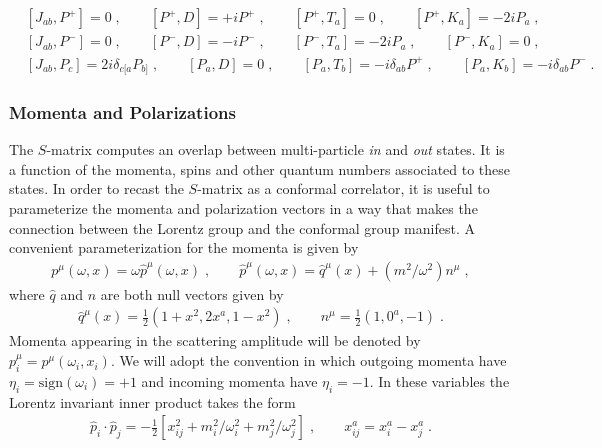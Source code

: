 \documentclass[11pt]{article}
\def\d{{\delta}}
\def\o{{\omega}}
\begin{document}
\begin{equation}
\begin{split}\label{eq:transAlgebra}
&[  J_{ab} ,  P^+ ] = 0  \;,  \qquad [ P^+ , D  ] = + i  P^+ \;, \qquad [ P^+ , T_a  ] = 0 \; , \qquad [ P^+ , K_a  ] = -2iP_a \; ,  \\
&[ J_{ab} ,  P^- ] =0  \;, \qquad [ P^- , D  ] = - i  P^- \;,  \qquad [ P^- , T_a  ] = -2iP_a \;,  \qquad [ P^- , K_a  ] = 0 \; , \\
&[ J_{ab} ,  P_c ] = 2 i \d_{c[a}  P_{b]}    \;,  \qquad [ P_a , D ] = 0 \;,  \qquad [ P_a , T_b ] = -i\delta_{ab}P^+ \; ,  \qquad [ P_a , K_b ] = -i\delta_{ab}P^- \;.  
\end{split}
\end{equation}



\subsubsection*{Momenta and Polarizations}

The $S$-matrix computes an overlap between multi-particle \emph{in} and \emph{out} states. It is a function of the momenta, spins and other quantum numbers associated to these states. In order to recast the $S$-matrix as a conformal correlator, it is useful to parameterize the momenta and polarization vectors in a way that makes the connection between the Lorentz group and the conformal group manifest. A convenient parameterization for the momenta is given by
\begin{equation}
\begin{split}\label{mompar}
p^\mu(\o,x) = \o {\hat p}^\mu ( \o , x ) \; , \qquad {\hat p}^\mu(\o,x) = {\hat q}^\mu(x) + ( m^2 / \o^2 )  n^\mu \; , 
\end{split}
\end{equation}
where ${\hat q}$ and $n$ are both null vectors given by
\begin{equation}\label{eq:nullMom}
\begin{split}
{\hat q}^\mu(x) = \frac{1}{2} ( 1 + x^2 , 2 x^a , 1 - x^2 ) \; , \qquad n^\mu = \frac{1}{2} ( 1 , 0^a , - 1 )  \; . 
\end{split}
\end{equation}
Momenta appearing in the scattering amplitude will be denoted by $p^\mu_i = p^\mu ( \o_i , x_i )$. We will adopt the convention in which outgoing momenta have $\eta_i = \text{sign}(\o_i) = +1$ and incoming momenta have $\eta_i = -1$. In these variables the Lorentz invariant inner product takes the form
\begin{equation}
\begin{split}
{\hat p}_i \cdot {\hat p}_j = - \frac{1}{2} [ x_{ij}^2 + m_i^2 / \o_i^2 + m_j^2 / \o_j^2  ] \; , \qquad x_{ij}^a = x_i^a - x_j^a \; .
\end{split}
\end{equation}
\end{document}
